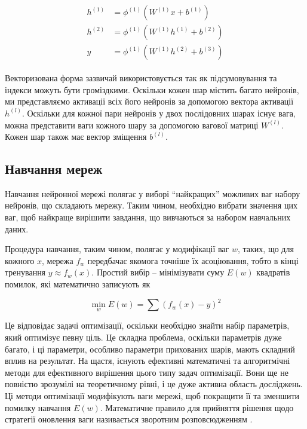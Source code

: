 \vspace{0.5em}
\begin{gather}
\begin{aligned}
    h^{(1)} &= \phi^{(1)}(W^{(1)}x + b^{(1)}) \\
    h^{(2)} &= \phi^{(1)}(W^{(1)}h^{(1)} + b^{(2)}) \\
    y &= \phi^{(1)}(W^{(1)}h^{(2)} + b^{(3)}) 
\end{aligned}
\end{gather}
\vspace{\baselineskip}

Векторизована форма зазвичай використовується так як підсумовування
та індекси можуть бути громіздкими. Оскільки кожен шар містить
багато нейронів, ми представляємо активації всіх його нейронів
за допомогою вектора активації $h^{(l)}$. Оскільки для кожної пари
нейронів у двох послідовних шарах існує вага, можна представити
ваги кожного шару за допомогою вагової матриці $W^{(l)}$. Кожен шар також має вектор зміщення $b^{(l)}$.

\subsection{Навчання мереж}
Навчання нейронної мережі полягає у виборі ``найкращих'' можливих
ваг набору нейронів, що складають мережу. Таким чином,
необхідно вибрати значення цих ваг, щоб найкраще вирішити
завдання, що вивчаються за набором навчальних даних.

Процедура навчання, таким чином, полягає у модифікації ваг $w$,
таких, що для кожного $x$, мережа $f_w$ передбачає якомога
точніше їх асоціювання, тобто в кінці тренування $y \approx f_w(x)$.
Простий вибір -- мінімізувати суму $E(w)$ квадратів
помилок, які математично записують як

\begin{equation}
    \min_w E(w) = \sum (f_w(x) - y)^2
\end{equation}

Це відповідає задачі оптимізації, оскільки необхідно знайти
набір параметрів, який оптимізує певну ціль.
Це складна проблема, оскільки параметрів дуже багато, і ці
параметри, особливо параметри прихованих шарів, мають складний
вплив на результат. На щастя, існують ефективні математичні та
алгоритмічні методи для ефективного вирішення цього типу задач
оптимізації. Вони ще не повністю зрозумілі на теоретичному
рівні, і це дуже активна область досліджень. Ці методи
оптимізації модифікують ваги мережі, щоб покращити її та
зменшити помилку навчання $E(w)$. Математичне
правило для прийняття рішення щодо стратегії оновлення
ваги називається зворотним розповсюдженням \cite{nn:backpropagation}.

